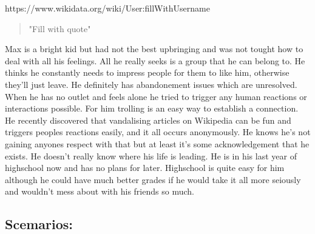 \documentclass{article}
\begin{document}
https://www.wikidata.org/wiki/User:fillWithUsername
\begin{quote}
"Fill with quote"
\end{quote}

Max is a bright kid but had not the best upbringing and was not tought how to deal with all his feelings. All he really seeks is a group that he can belong to. He thinks he constantly needs to impress people for them to like him, otherwise they'll just leave. He definitely has abandonement issues which are unresolved. When he has no outlet and feels alone he tried to trigger any human reactions or interactions possible. For him trolling is an easy way to establish a connection. He recently discovered that vandalising articles on Wikipedia can be fun and triggers peoples reactions easily, and it all occurs anonymously. He knows he's not gaining anyones respect with that but at least it's some acknowledgement that he exists. He doesn't really know where his life is leading. He is in his last year of highschool now and has no plans for later. Highschool is quite easy for him although he could have much better grades if he would take it all more seiously and wouldn't mess about with his friends so much. 

\subsection{Scemarios:}
\end{document}
